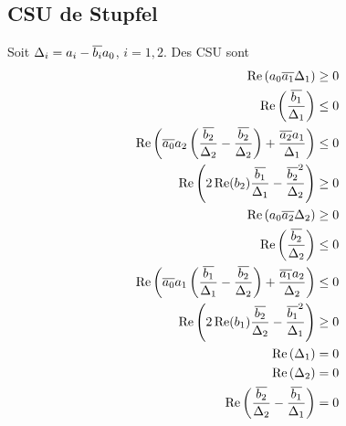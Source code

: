 

\subsection{CSU de Stupfel}

  \begin{prop}
    Soit \(\Delta_i = a_i-{\overline{b_i}}a_0\), \(i=1,2\). Des CSU sont
    \begin{align}
      \operatorname{Re}\left(a_0{\overline{a_1}}\Delta_1\right) \ge 0 \\
      \operatorname{Re}\left(\dfrac{{\overline{b_1}}}{\Delta_1}\right) \le 0 \\
      \operatorname{Re}\left({\overline{a_0}}a_2\left(\dfrac{{\overline{b_2}}}{\Delta_2}-\dfrac{{\overline{b_2}}}{\Delta_2}\right) + \dfrac{{\overline{a_2}}a_1}{\Delta_1} \right)\le 0\\
      \operatorname{Re}\left(2\operatorname{Re}(b_2)\dfrac{{\overline{b_1}}}{\Delta_1}-\dfrac{{\overline{b_2}}^2}{\Delta_2}\right) \ge 0\\
      \operatorname{Re}\left(a_0{\overline{a_2}}\Delta_2\right) \ge 0 \\
      \operatorname{Re}\left(\dfrac{{\overline{b_2}}}{\Delta_2}\right) \le 0 \\
      \operatorname{Re}\left({\overline{a_0}}a_1\left(\dfrac{{\overline{b_1}}}{\Delta_1}-\dfrac{{\overline{b_2}}}{\Delta_2}\right) + \dfrac{{\overline{a_1}}a_2}{\Delta_2} \right)\le 0\\
      \operatorname{Re}\left(2\operatorname{Re}(b_1)\dfrac{{\overline{b_2}}}{\Delta_2}-\dfrac{{\overline{b_1}}^2}{\Delta_1}\right) \ge 0\\
      \operatorname{Re}\left(\Delta_1\right) = 0 \\
      \operatorname{Re}\left(\Delta_2\right) = 0 \\
      \operatorname{Re}\left(\dfrac{{\overline{b_2}}}{\Delta_2}-\dfrac{{\overline{b_1}}}{\Delta_1}\right) = 0\\
    \end{align}
  \end{prop}
  

